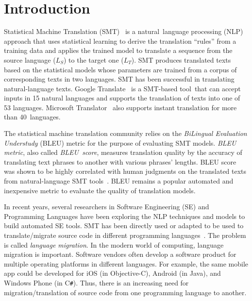 \section{Introduction}
\label{sec:intro}

Statistical Machine Translation (SMT)~\cite{smtbook} is a
natural~language processing (NLP) approach that uses statistical
learning to derive the translation ``rules'' from a training data and
applies the trained model to translate a sequence from the source
language ($L_S$) to the target one ($L_T$). SMT produces translated
texts based on the statistical models whose parameters are trained
from a corpus of corresponding texts in two languages. SMT has
been successful in translating natural-language texts.  Google
Translate~\cite{googletranslate} is a SMT-based tool~that can accept
inputs in 15 natural languages and supports the translation of texts
into one of 53 languages. Microsoft Translator~\cite{mstranslator}
also supports instant translation for more than 40~languages.

The statistical machine translation community relies on the {\em
  BiLingual Evaluation Understudy} (BLEU) metric for the purpose of
evaluating SMT models. {\em BLEU metric}, also called {\em
  BLEU~score}, measures translation quality by the accuracy of
translating text phrases to another with various phrases'
lengths. BLEU score was shown to be highly correlated with human judgments
on the translated texts from natural-language SMT
tools~\cite{Papineni2002}.
%
BLEU remains a popular automated and inexpensive
metric to evaluate the quality of translation models.



In recent years, several researchers in Software Engineering (SE) and
Programming Languages have been exploring the NLP techniques and
models to build automated SE tools. SMT has been directly used or
adapted to be used to translate/migrate source code in different
programming
languages~\cite{fse13-nier,icse14-demo,karaivanov14,ase15,icsme16}. The
problem is called {\em language migration}. In the modern world of
computing, language migration is important. Software vendors often
develop a software product for multiple operating platforms in
different languages. For example, the same mobile app could be
developed for iOS (in Objective-C), Android (in Java), and Windows
Phone (in C\texttt{\#}).
Thus, there is an increasing need for migration/translation
of source code from one programming language to another.
%

